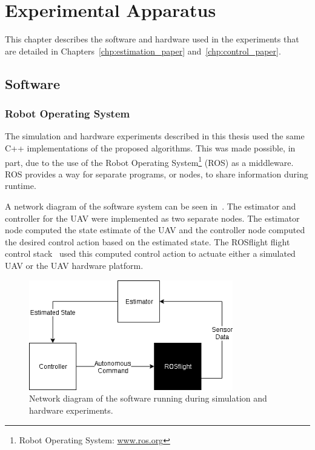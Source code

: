 
\chapter{Experimental Apparatus}
\label{chp:experimental_apparatus}

This chapter describes the software and hardware used in the experiments that
are detailed in Chapters~\ref{chp:estimation_paper} and~\ref{chp:control_paper}.

\section{Software}
\subsection {Robot Operating System}
The simulation and hardware experiments described in this thesis used the same
C++ implementations of the proposed algorithms.
This was made possible, in part, due to the use of the Robot Operating System\footnote{Robot Operating System:
\url{www.ros.org}}
(ROS) as a middleware. ROS provides a way for separate
programs, or nodes, to share information during runtime.

A network diagram of the software system can be seen in~. The estimator and
controller for the UAV were implemented as two separate nodes. 
The estimator node computed the state estimate of the UAV and the controller
node computed the desired control action based on the estimated state.
The ROSflight flight control stack~\cite{jackson2016rosflight}
used this computed control action to actuate
either a simulated UAV or the UAV hardware platform.

\begin{figure}[htbp]
  \centering
  \includegraphics[width=3.5in]{figures/roscopter.png}
  \caption[Software Architecture Network Diagram]{Network diagram of the
  software running during simulation and hardware experiments.}
%
  \label{fig:network_diagram}
\end{figure}

